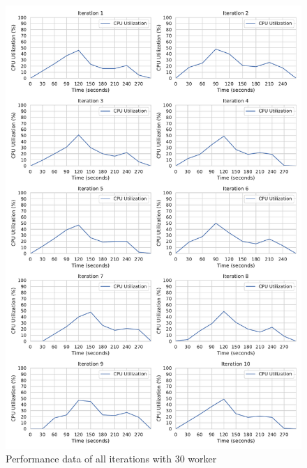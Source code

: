 \begin{figure}[h]
\centering
\includegraphics[scale=0.4]{images/07_evaluation/regression/30_worker_cpu_performance}
\caption{Performance data of all iterations with 30 worker}
\label{fig:appendix_eval_regression_static30}
\end{figure}

